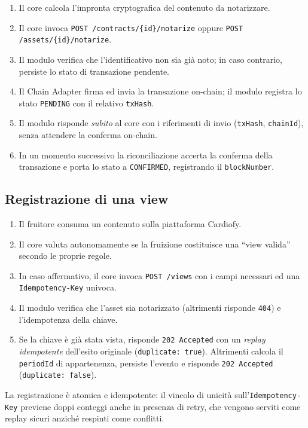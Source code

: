 \documentclass[a4paper,11pt]{article}
\begin{document}
\begin{enumerate}[leftmargin=*, itemsep=0.1em]
    \item Il core calcola l'impronta cryptografica del contenuto da notarizzare.
    \item Il core invoca \texttt{POST /contracts/\{id\}/notarize} oppure \texttt{POST /assets/\{id\}/notarize}.
    \item Il modulo verifica che l'identificativo non sia gi\`a noto; in caso contrario, persiste lo stato di transazione pendente.
    \item Il Chain Adapter firma ed invia la transazione on-chain; il modulo registra lo stato \texttt{PENDING} con il relativo \texttt{txHash}.
    \item Il modulo risponde \emph{subito} al core con i riferimenti di invio (\texttt{txHash}, \texttt{chainId}), senza attendere la conferma on-chain.
    \item In un momento successivo la riconciliazione accerta la conferma della transazione e porta lo stato a \texttt{CONFIRMED}, registrando il \texttt{blockNumber}.
\end{enumerate}

\subsection{Registrazione di una view}

\begin{enumerate}[leftmargin=*, itemsep=0.1em]
    \item Il fruitore consuma un contenuto sulla piattaforma Cardiofy.
    \item Il core valuta autonomamente se la fruizione costituisce una ``view valida'' secondo le proprie regole.
    \item In caso affermativo, il core invoca \texttt{POST /views} con i campi necessari ed una \texttt{Idempotency-Key} univoca.
    \item Il modulo verifica che l'asset sia notarizzato (altrimenti risponde \texttt{404}) e l'idempotenza della chiave.
    \item Se la chiave \`e gi\`a stata vista, risponde \texttt{202 Accepted} con un \emph{replay idempotente} dell'esito originale (\texttt{duplicate: true}). Altrimenti calcola il \texttt{periodId} di appartenenza, persiste l'evento e risponde \texttt{202 Accepted} (\texttt{duplicate: false}).
\end{enumerate}

\noindent La registrazione \`e atomica e idempotente: il vincolo di unicit\`a sull'\texttt{Idempotency-Key} previene doppi conteggi anche in presenza di retry, che vengono serviti come replay sicuri anzich\'e respinti come conflitti.
\end{document}
